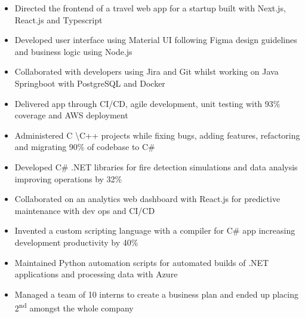 \documentclass[11pt,a4paper,ragged2e]{altacv}
\begin{document}
\begin{paracol}{1}
\begin{itemize}
\item Directed the frontend of a travel web app for a startup built with Next.js, React.js and Typescript
\item Developed user interface using Material UI following Figma design guidelines and business logic using Node.js
\item Collaborated with developers using Jira and Git whilst working on Java Springboot with PostgreSQL and Docker
\item Delivered app through CI/CD, agile development, unit testing with 93\% coverage and AWS deployment
\end{itemize}
\tightdivider

\begin{itemize}
\item Administered C \textbackslash C++ projects while fixing bugs, adding features, refactoring and migrating 90\% of codebase to C\#
\item Developed C\# .NET libraries for fire detection simulations and data analysis improving operations by 32\%
\item Collaborated on an analytics web dashboard with React.js for predictive maintenance with dev ops and CI/CD
\item Invented a custom scripting language with a compiler for C\# app increasing development productivity by 40\%
\item Maintained Python automation scripts for automated builds of .NET applications and processing data with Azure
\item Managed a team of 10 interns to create a business plan and ended up placing  2\textsuperscript{nd} amongst the whole company
\end{itemize}
\tightdivider


\end{paracol}
\end{document}
